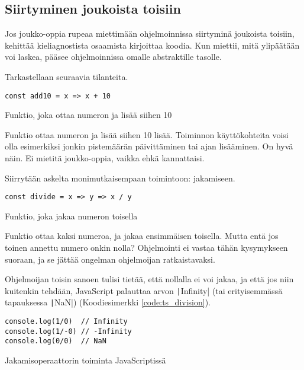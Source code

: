 \subsection{Siirtyminen joukoista toisiin}
Jos joukko-oppia rupeaa miettimään ohjelmoinnissa siirtyminä joukoista toisiin, kehittää kieliagnostista osaamista kirjoittaa koodia. Kun miettii, mitä ylipäätään voi laskea, pääsee ohjelmoinnissa omalle abstraktille tasolle. \citep{Tan2004,BlellochHarper2015}

Tarkastellaan seuraavia tilanteita.

\begin{code}
    \begin{verbatim}
const add10 = x => x + 10  
\end{verbatim}
    \caption{Funktio, joka ottaa numeron ja lisää siihen 10}
    \label{code:ts_set_theory_1}
\end{code}

Funktio ottaa numeron ja lisää siihen 10 lisää. Toiminnon käyttökohteita voisi olla esimerkiksi jonkin pistemäärän päivittäminen tai ajan lisääminen. On hyvä näin. Ei mietitä joukko-oppia, vaikka ehkä kannattaisi.

Siirrytään askelta monimutkaisempaan toimintoon: jakamiseen.


\begin{code}
    \begin{verbatim}
const divide = x => y => x / y
\end{verbatim}
    \caption{Funktio, joka jakaa numeron toisella}
    \label{code:ts_set_theory_3}
\end{code}

Funktio ottaa kaksi numeroa, ja jakaa ensimmäisen toisella. Mutta entä jos toinen annettu numero onkin nolla? Ohjelmointi ei vastaa tähän kysymykseen suoraan, ja se jättää ongelman ohjelmoijan ratkaistavaksi.

Ohjelmoijan toisin sanoen tulisi tietää, että nollalla ei voi jakaa, ja että jos niin kuitenkin tehdään, JavaScript palauttaa arvon \texttt|Infinity| (tai erityisemmässä tapauksessa \texttt|NaN|) (Koodiesimerkki \ref{code:ts_division}).

\begin{code}
    \begin{verbatim}
console.log(1/0)  // Infinity
console.log(1/-0) // -Infinity
console.log(0/0)  // NaN
\end{verbatim}
    \caption{Jakamisoperaattorin toiminta JavaScriptissä}
    \label{code:ts_division}
\end{code}

